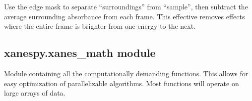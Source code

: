 \documentclass[letterpaper,10pt,english]{sphinxmanual}
\begin{document}
\begin{fulllineitems}

\begin{fulllineitems}
\label{\detokenize{xanespy:xanespy.xanes_frameset.XanesFrameset.subtract_surroundings}}
Use the edge mask to separate ``surroundings'' from ``sample'', then
subtract the average surrounding absorbance from each
frame. This effective removes effects where the entire frame
is brighter from one energy to the next.

\end{fulllineitems}


\end{fulllineitems}



\subsection{xanespy.xanes\_math module}
\label{\detokenize{xanespy:xanespy-xanes-math-module}}\label{\detokenize{xanespy:module-xanespy.xanes_math}}
Module containing all the computationally demanding functions. This
allows for easy optimization of parallelizable algorithms. Most
functions will operate on large arrays of data.
\end{document}
